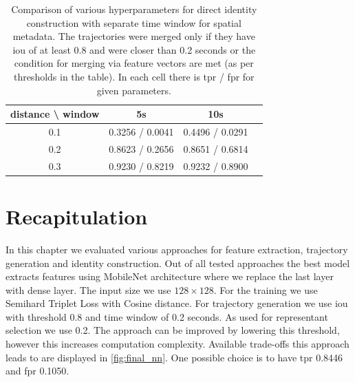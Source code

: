 \begin{table}[]
    \centering
    \begin{tabular}{c||c|c|c}
     distance \textbackslash{} window & 5s & 10s \\ \hline \hline
     0.1 & 0.3256 / 0.0041 & 0.4496 / 0.0291  \\ \hline
     0.2 & 0.8623 / 0.2656 & 0.8651 / 0.6814 \\ \hline
     0.3 & 0.9230 / 0.8219 & 0.9232 / 0.8900
    \end{tabular}
    \caption[Comparison of various hyperparameters for direct identity construction with separate time window for spatial metadata]{Comparison of various hyperparameters for direct identity construction with separate time window for spatial metadata. The trajectories were merged only if they have \gls{iou} of at least 0.8 and were closer than 0.2 seconds or the condition for merging via feature vectors are met (as per thresholds in the table). In each cell there is \gls{tpr} / \gls{fpr} for given parameters.}
    \label{tab:direct_time_window}
\end{table}

\section{Recapitulation}

In this chapter we evaluated various approaches for feature extraction, trajectory generation and identity construction. Out of all tested approaches the best model extracts features using MobileNet architecture where we replace the last layer with dense layer. The input size we use $128 \times 128$. For the training we use Semihard Triplet Loss with Cosine distance. For trajectory generation we use \gls{iou} with threshold 0.8 and time window of 0.2 seconds. As used for representant selection we use 0.2. The approach can be improved by lowering this threshold, however this increases computation complexity. Available trade-offs this approach leads to are displayed in \autoref{fig:final_nn}. One possible choice is to have \gls{tpr} 0.8446 and \gls{fpr} 0.1050.